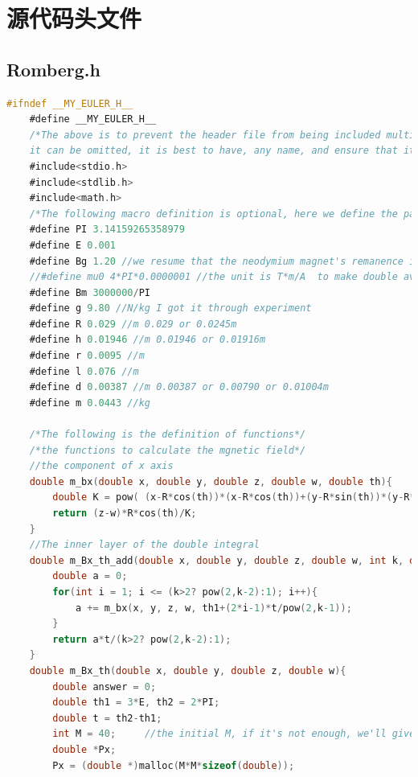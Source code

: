 \documentclass[AutoFakeBold]{LZUThesis}
\begin{document}
\section{源代码头文件}
\label{源代码头文件}

\subsection{Romberg.h}
\begin{lstlisting}[language = C]
    #ifndef __MY_EULER_H__
    #define __MY_EULER_H__
    /*The above is to prevent the header file from being included multiple times,
    it can be omitted, it is best to have, any name, and ensure that it is unique*/
    #include<stdio.h>
    #include<stdlib.h>
    #include<math.h>
    /*The following macro definition is optional, here we define the parameter we need*/
    #define PI 3.14159265358979
    #define E 0.001
    #define Bg 1.20 //we resume that the neodymium magnet's remanence is the averger value of 1.18-1.22T which is the N35's parameter
    //#define mu0 4*PI*0.0000001 //the unit is T*m/A  to make double available, we chose to use Bg/mu0 which we called Bm.
    #define Bm 3000000/PI
    #define g 9.80 //N/kg I got it through experiment
    #define R 0.029 //m 0.029 or 0.0245m
    #define h 0.01946 //m 0.01946 or 0.01916m
    #define r 0.0095 //m
    #define l 0.076 //m
    #define d 0.00387 //m 0.00387 or 0.00790 or 0.01004m
    #define m 0.0443 //kg
    
    /*The following is the definition of functions*/
    /*the functions to calculate the mgnetic field*/
    //the component of x axis
    double m_bx(double x, double y, double z, double w, double th){
        double K = pow( (x-R*cos(th))*(x-R*cos(th))+(y-R*sin(th))*(y-R*sin(th))+(z-w)*(z-w) , 1.5);
        return (z-w)*R*cos(th)/K;
    }
    //The inner layer of the double integral
    double m_Bx_th_add(double x, double y, double z, double w, int k, double th1, double t){
        double a = 0;
        for(int i = 1; i <= (k>2? pow(2,k-2):1); i++){
            a += m_bx(x, y, z, w, th1+(2*i-1)*t/pow(2,k-1));
        }
        return a*t/(k>2? pow(2,k-2):1);
    }
    double m_Bx_th(double x, double y, double z, double w){
        double answer = 0;
        double th1 = 3*E, th2 = 2*PI;
        double t = th2-th1;
        int M = 40;     //the initial M, if it's not enough, we'll give you an alert and you need to enlarge M
        double *Px;
        Px = (double *)malloc(M*M*sizeof(double));
    

\end{lstlisting}
\end{document}
